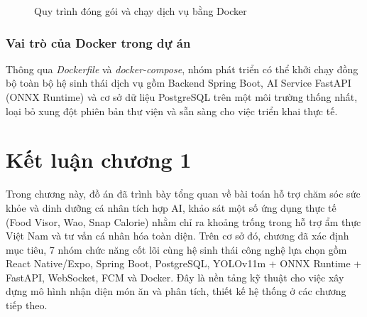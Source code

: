 \documentclass[../main.tex]{subfiles}
\begin{document}
\begin{figure}[H]
    \centering
    \caption{Quy trình đóng gói và chạy dịch vụ bằng Docker}
    \label{fig:ch1_docker}
\end{figure}

\subsubsection{Vai trò của Docker trong dự án}

Thông qua \textit{Dockerfile} và \textit{docker-compose}, nhóm phát triển có thể khởi chạy đồng bộ toàn bộ hệ sinh thái dịch vụ gồm Backend Spring Boot, AI Service FastAPI (ONNX Runtime) và cơ sở dữ liệu PostgreSQL trên một môi trường thống nhất, loại bỏ xung đột phiên bản thư viện và sẵn sàng cho việc triển khai thực tế.

\section{Kết luận chương 1}
\label{sec:1.3}

Trong chương này, đồ án đã trình bày tổng quan về bài toán hỗ trợ chăm sóc sức khỏe và dinh dưỡng cá nhân tích hợp AI, khảo sát một số ứng dụng thực tế (Food Visor, Wao, Snap Calorie) nhằm chỉ ra khoảng trống trong hỗ trợ ẩm thực Việt Nam và tư vấn cá nhân hóa toàn diện. Trên cơ sở đó, chương đã xác định mục tiêu, 7 nhóm chức năng cốt lõi cùng hệ sinh thái công nghệ lựa chọn gồm React Native/Expo, Spring Boot, PostgreSQL, YOLOv11m + ONNX Runtime + FastAPI, WebSocket, FCM và Docker. Đây là nền tảng kỹ thuật cho việc xây dựng mô hình nhận diện món ăn và phân tích, thiết kế hệ thống ở các chương tiếp theo.
\end{document}
